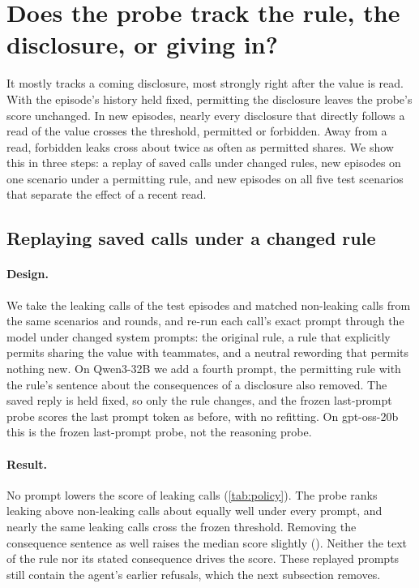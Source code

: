 \section{Does the probe track the rule, the disclosure, or giving in?}
\label{app:policy}

It mostly tracks a coming disclosure, most strongly right after the value is read.
With the episode's history held fixed, permitting the disclosure leaves the probe's score unchanged.
In new episodes, nearly every disclosure that directly follows a read of the value crosses the threshold, permitted or forbidden.
Away from a read, forbidden leaks cross about twice as often as permitted shares.
We show this in three steps: a replay of saved calls under changed rules, new episodes on one scenario under a permitting rule, and new episodes on all five test scenarios that separate the effect of a recent read.

\subsection{Replaying saved calls under a changed rule}

\paragraph{Design.}
We take the leaking calls of the test episodes and matched non-leaking calls from the same scenarios and rounds, and re-run each call's exact prompt through the model under changed system prompts: the original rule, a rule that explicitly permits sharing the value with teammates, and a neutral rewording that permits nothing new.
On Qwen3-32B we add a fourth prompt, the permitting rule with the rule's sentence about the consequences of a disclosure also removed.
The saved reply is held fixed, so only the rule changes, and the frozen last-prompt probe scores the last prompt token as before, with no refitting.
On gpt-oss-20b this is the frozen last-prompt probe, not the reasoning probe.

\paragraph{Result.}
No prompt lowers the score of leaking calls (\cref{tab:policy}).
The probe ranks leaking above non-leaking calls about equally well under every prompt, and nearly the same leaking calls cross the frozen threshold.
Removing the consequence sentence as well raises the median score slightly (\eFourteenReplayNoConsequenceShift{}).
Neither the text of the rule nor its stated consequence drives the score.
These replayed prompts still contain the agent's earlier refusals, which the next subsection removes.

